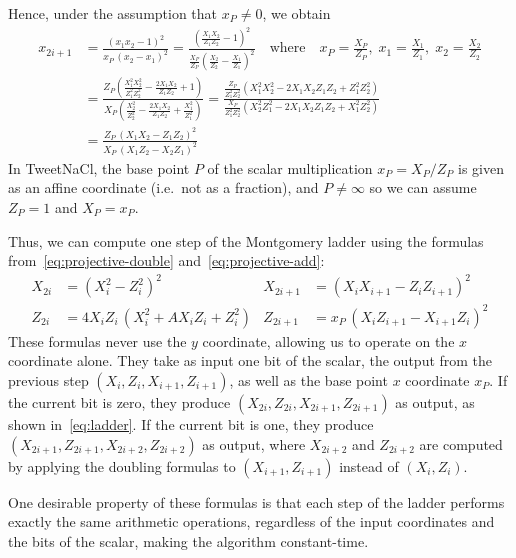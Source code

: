 \documentclass{article}
\begin{document}
Hence, under the assumption that $x_P \ne 0$, we obtain
\begin{align}
x_{2i+1} &= \frac{(x_1 x_2 - 1)^2}{x_P\,(x_2 - x_1)^2}
    = \frac{\left(\frac{X_1 X_2}{Z_1 Z_2} - 1\right)^2}{\frac{X_P}{Z_P} \left(\frac{X_2}{Z_2} - \frac{X_1}{Z_1}\right)^2}
    \quad\text{where}\quad x_P = \frac{X_P}{Z_P},\; x_1 = \frac{X_1}{Z_1},\; x_2 = \frac{X_2}{Z_2} \nonumber\\[5pt]
&= \frac{Z_P \left(\frac{X_1^2 X_2^2}{Z_1^2 Z_2^2} - \frac{2X_1 X_2}{Z_1 Z_2} + 1\right)}{X_P \left(\frac{X_2^2}{Z_2^2} - \frac{2X_1 X_2}{Z_1 Z_2} + \frac{X_1^2}{Z_1^2}\right)}
= \frac{\frac{Z_P}{Z_1^2 Z_2^2} \left(X_1^2 X_2^2 - 2X_1 X_2 Z_1 Z_2 + Z_1^2 Z_2^2\right)}{\frac{X_P}{Z_1^2 Z_2^2} \left(X_2^2 Z_1^2 - 2X_1 X_2 Z_1 Z_2 + X_1^2 Z_2^2\right)} \nonumber\\[5pt]
    &= \frac{Z_P\,(X_1 X_2 - Z_1 Z_2)^2}{X_P\,(X_1 Z_2 - X_2 Z_1)^2} \label{eq:projective-add}
\end{align}
In TweetNaCl, the base point $P$ of the scalar multiplication $x_P = X_P/Z_P$ is given as an affine coordinate (i.e.\ not as a fraction), and $P \ne \infty$ so we can assume $Z_P=1$ and $X_P=x_P$.

Thus, we can compute one step of the Montgomery ladder using the formulas from~\eqref{eq:projective-double} and~\eqref{eq:projective-add}:
\begin{align}
X_{2i} &= (X_i^2 - Z_i^2)^2 &
X_{2i+1} &= (X_i X_{i+1} - Z_i Z_{i+1})^2 \label{eq:ladder-step}\\
Z_{2i} &= 4X_i Z_i\,(X_i^2 + AX_i Z_i + Z_i^2) &
Z_{2i+1} &= x_P\,(X_i Z_{i+1} - X_{i+1} Z_i)^2 \nonumber
\end{align}
These formulas never use the $y$ coordinate, allowing us to operate on the $x$ coordinate alone.
They take as input one bit of the scalar, the output from the previous step $(X_i, Z_i, X_{i+1}, Z_{i+1})$, as well as the base point $x$ coordinate $x_P$.
If the current bit is zero, they produce $(X_{2i}, Z_{2i}, X_{2i+1}, Z_{2i+1})$ as output, as shown in~\eqref{eq:ladder}.
If the current bit is one, they produce $(X_{2i+1}, Z_{2i+1}, X_{2i+2}, Z_{2i+2})$ as output, where $X_{2i+2}$ and $Z_{2i+2}$ are computed by applying the doubling formulas to $(X_{i+1}, Z_{i+1})$ instead of $(X_i, Z_i)$.

One desirable property of these formulas is that each step of the ladder performs exactly the same arithmetic operations, regardless of the input coordinates and the bits of the scalar, making the algorithm constant-time.
\end{document}
